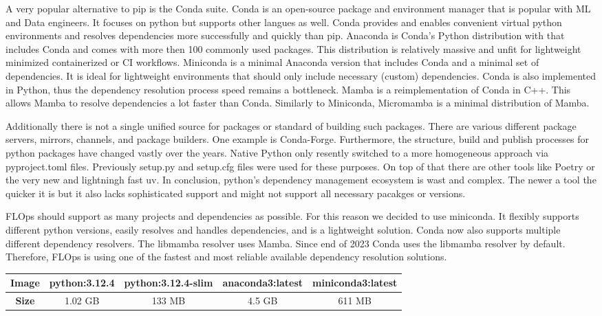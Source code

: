 A very popular alternative to pip is the Conda suite.
Conda is an open-source package and environment manager that is popular with ML and Data engineers.
It focuses on python but supports other langues as well.
Conda provides and enables convenient virtual python environments and resolves dependencies more successfully and quickly than pip.
Anaconda is Conda's Python distribution with that includes Conda and comes with more then 100 commonly used packages.
This distribution is relatively massive and unfit for lightweight minimized containerized or CI workflows.
Miniconda is a minimal Anaconda version that includes Conda and a minimal set of dependencies.
It is ideal for lightweight environments that should only include necessary (custom) dependencies.
Conda is also implemented in Python, thus the dependency resolution process speed remains a bottleneck.
Mamba is a reimplementation of Conda in C++.
This allows Mamba to resolve dependencies a lot faster than Conda.
Similarly to Miniconda, Micromamba is a minimal distribution of Mamba.

Additionally there is not a single unified source for packages or standard of building such packages.
There are various different package servers, mirrors, channels, and package builders.
One example is Conda-Forge.
Furthermore, the structure, build and publish processes for python packages have changed vastly over the years.
Native Python only resently switched to a more homogeneous approach via pyproject.toml files.
Previously setup.py and setup.cfg files were used for these purposes.
On top of that there are other tools like Poetry or the very new and lightningh fast uv.
In conclusion, python's dependency management ecosystem is wast and complex.
The newer a tool the quicker it is but it also lacks sophisticated support and might not support all necessary pacakges or versions.

FLOps should support as many projects and dependencies as possible.
For this reason we decided to use miniconda.
It flexibly supports different python versions, easily resolves and handles dependencies, and is a lightweight solution.
Conda now also supports multiple different dependency resolvers.
The libmamba resolver uses Mamba.
Since end of 2023 Conda uses the libmamba resolver by default.
Therefore, FLOps is using one of the fastest and most reliable available dependency resolution solutions.

\begin{changemargin}{0cm}{0cm}
    \centering
    \begin{tabular}{|c||c|c|c|c|}
        \hline
            \textbf{Image} & python:3.12.4 & python:3.12.4-slim & anaconda3:latest & miniconda3:latest \\
        \hline
            \textbf{Size} & 1.02 GB & 133 MB & 4.5 GB & 611 MB
        \\
        \hline
    \end{tabular}
    \label{table:conda_python_comparison}
\end{changemargin}

